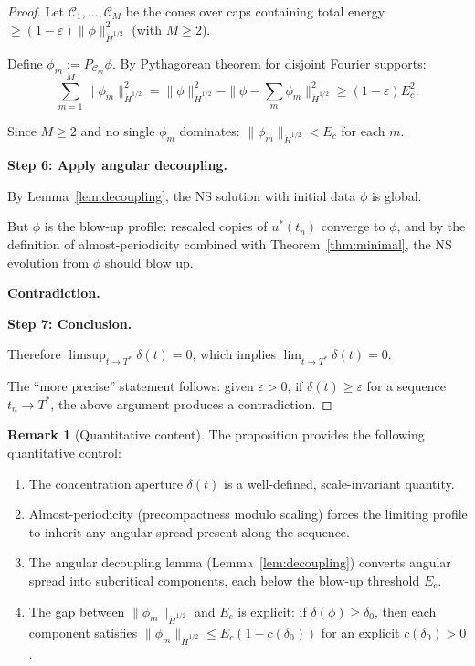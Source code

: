 \documentclass[11pt]{article}
\theoremstyle{definition}
\newtheorem{remark}[theorem]{Remark}
\begin{document}
\begin{proof}
Let $\mathcal{C}_1, \ldots, \mathcal{C}_M$ be the cones over caps containing total energy $\geq (1 - \varepsilon)\|\phi\|_{\dot{H}^{1/2}}^2$ (with $M \geq 2$).

Define $\phi_m := P_{\mathcal{C}_m} \phi$. By Pythagorean theorem for disjoint Fourier supports:
\begin{equation}
\sum_{m=1}^M \|\phi_m\|_{\dot{H}^{1/2}}^2 = \|\phi\|_{\dot{H}^{1/2}}^2 - \|\phi - \sum_m \phi_m\|_{\dot{H}^{1/2}}^2 \geq (1-\varepsilon) E_c^2.
\end{equation}

Since $M \geq 2$ and no single $\phi_m$ dominates: $\|\phi_m\|_{\dot{H}^{1/2}} < E_c$ for each $m$.

\textbf{Step 6: Apply angular decoupling.}

By Lemma~\ref{lem:decoupling}, the NS solution with initial data $\phi$ is global.

But $\phi$ is the blow-up profile: rescaled copies of $u^*(t_n)$ converge to $\phi$, and by the definition of almost-periodicity combined with Theorem~\ref{thm:minimal}, the NS evolution from $\phi$ should blow up.

\textbf{Contradiction.}

\textbf{Step 7: Conclusion.}

Therefore $\limsup_{t \to T^*} \delta(t) = 0$, which implies $\lim_{t \to T^*} \delta(t) = 0$.

The ``more precise'' statement follows: given $\varepsilon > 0$, if $\delta(t) \geq \varepsilon$ for a sequence $t_n \to T^*$, the above argument produces a contradiction.
\end{proof}

\begin{remark}[Quantitative content]
The proposition provides the following quantitative control:
\begin{enumerate}
\item The concentration aperture $\delta(t)$ is a well-defined, scale-invariant quantity.
\item Almost-periodicity (precompactness modulo scaling) forces the limiting profile to inherit any angular spread present along the sequence.
\item The angular decoupling lemma (Lemma~\ref{lem:decoupling}) converts angular spread into subcritical components, each below the blow-up threshold $E_c$.
\item The gap between $\|\phi_m\|_{\dot{H}^{1/2}}$ and $E_c$ is explicit: if $\delta(\phi) \geq \delta_0$, then each component satisfies $\|\phi_m\|_{\dot{H}^{1/2}} \leq E_c(1 - c(\delta_0))$ for an explicit $c(\delta_0) > 0$.
\end{enumerate}
\end{remark}
\end{document}
